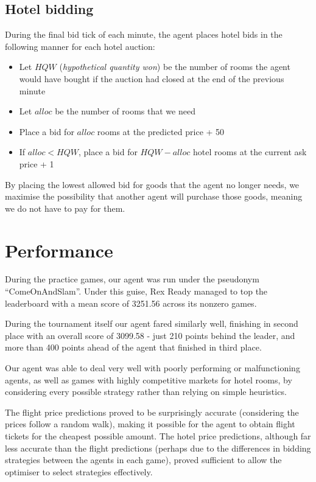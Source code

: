 \documentclass[a4paper]{proc}
\begin{document}
\subsection{Hotel bidding}

During the final bid tick of each minute, the agent places hotel bids in the following manner for each hotel auction:

\begin{itemize}
  \item Let $HQW$ (\emph{hypothetical quantity won}) be the number of rooms the agent would have bought if the auction had closed at the end of the previous minute
  \item Let $alloc$ be the number of rooms that we need
  \item Place a bid for $alloc$ rooms at the predicted price + 50
  \item If $alloc < HQW$, place a bid for $HQW - alloc$ hotel rooms at the current ask price + 1
\end{itemize}

By placing the lowest allowed bid for goods that the agent no longer needs, we maximise the possibility that another agent will purchase those goods, meaning we do not have to pay for them.

\section{Performance}

During the practice games, our agent was run under the pseudonym ``ComeOnAndSlam''. Under this guise, Rex Ready managed to top the leaderboard with a mean score of 3251.56 across its nonzero games.

During the tournament itself our agent fared similarly well, finishing in second place with an overall score of 3099.58 - just 210 points behind the leader, and more than 400 points ahead of the agent that finished in third place.

Our agent was able to deal very well with poorly performing or malfunctioning agents, as well as games with highly competitive markets for hotel rooms, by considering every possible strategy rather than relying on simple heuristics.

The flight price predictions proved to be surprisingly accurate (considering the prices follow a random walk), making it possible for the agent to obtain flight tickets for the cheapest possible amount. The hotel price predictions, although far less accurate than the flight predictions (perhaps due to the differences in bidding strategies between the agents in each game), proved sufficient to allow the optimiser to select strategies effectively.
\end{document}
